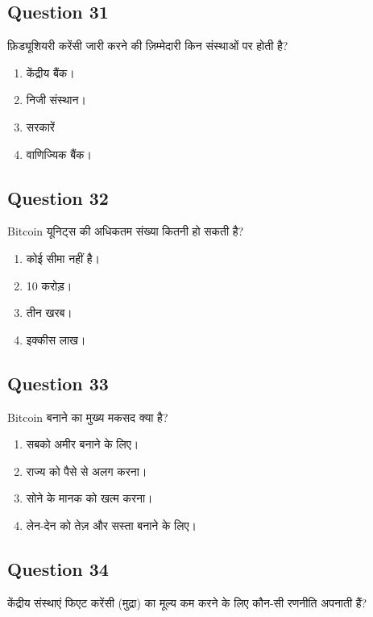 \documentclass[12pt,a4paper]{article}
\begin{document}
\bigskip


\subsection*{Question 31}
फ़िड्यूशियरी करेंसी जारी करने की ज़िम्मेदारी किन संस्थाओं पर होती है?

\begin{enumerate}[label=\Alph*., leftmargin=*]
\item केंद्रीय बैंक।
\item निजी संस्थान।
\item सरकारें
\item वाणिज्यिक बैंक।
\end{enumerate}

\bigskip


\subsection*{Question 32}
Bitcoin यूनिट्स की अधिकतम संख्या कितनी हो सकती है?

\begin{enumerate}[label=\Alph*., leftmargin=*]
\item कोई सीमा नहीं है।
\item 10 करोड़।
\item तीन खरब।
\item इक्कीस लाख।
\end{enumerate}

\bigskip


\subsection*{Question 33}
Bitcoin बनाने का मुख्य मकसद क्या है?

\begin{enumerate}[label=\Alph*., leftmargin=*]
\item सबको अमीर बनाने के लिए।
\item राज्य को पैसे से अलग करना।
\item सोने के मानक को खत्म करना।
\item लेन-देन को तेज़ और सस्ता बनाने के लिए।
\end{enumerate}

\bigskip


\subsection*{Question 34}
केंद्रीय संस्थाएं फिएट करेंसी (मुद्रा) का मूल्य कम करने के लिए कौन-सी रणनीति अपनाती हैं?
\end{document}
